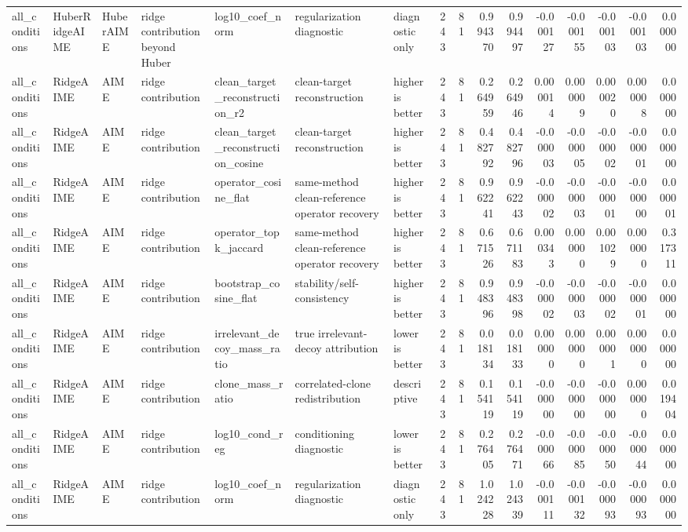 \begin{table}[t]
\begin{tabular}{lllllllrrrrrrrrr}
all_conditions & HuberRidgeAIME & HuberAIME & ridge contribution beyond Huber & log10_coef_norm & regularization diagnostic & diagnostic only & 243 & 81 & 0.994370 & 0.994497 & -0.000127 & -0.000155 & -0.000103 & -0.000103 & 0.000000 \\
all_conditions & RidgeAIME & AIME & ridge contribution & clean_target_reconstruction_r2 & clean-target reconstruction & higher is better & 243 & 81 & 0.264959 & 0.264946 & 0.000014 & 0.000009 & 0.000020 & 0.000008 & 0.000000 \\
all_conditions & RidgeAIME & AIME & ridge contribution & clean_target_reconstruction_cosine & clean-target reconstruction & higher is better & 243 & 81 & 0.482792 & 0.482796 & -0.000003 & -0.000005 & -0.000002 & -0.000001 & 0.000000 \\
all_conditions & RidgeAIME & AIME & ridge contribution & operator_cosine_flat & same-method clean-reference operator recovery & higher is better & 243 & 81 & 0.962241 & 0.962243 & -0.000002 & -0.000003 & -0.000001 & -0.000000 & 0.000001 \\
all_conditions & RidgeAIME & AIME & ridge contribution & operator_topk_jaccard & same-method clean-reference operator recovery & higher is better & 243 & 81 & 0.671526 & 0.671183 & 0.000343 & 0.000000 & 0.001029 & 0.000000 & 0.317311 \\
all_conditions & RidgeAIME & AIME & ridge contribution & bootstrap_cosine_flat & stability/self-consistency & higher is better & 243 & 81 & 0.948396 & 0.948398 & -0.000002 & -0.000003 & -0.000002 & -0.000001 & 0.000000 \\
all_conditions & RidgeAIME & AIME & ridge contribution & irrelevant_decoy_mass_ratio & true irrelevant-decoy attribution & lower is better & 243 & 81 & 0.018134 & 0.018133 & 0.000000 & 0.000000 & 0.000001 & 0.000000 & 0.000000 \\
all_conditions & RidgeAIME & AIME & ridge contribution & clone_mass_ratio & correlated-clone redistribution & descriptive & 243 & 81 & 0.154119 & 0.154119 & -0.000000 & -0.000000 & -0.000000 & 0.000000 & 0.019404 \\
all_conditions & RidgeAIME & AIME & ridge contribution & log10_cond_reg & conditioning diagnostic & lower is better & 243 & 81 & 0.276405 & 0.276471 & -0.000066 & -0.000085 & -0.000050 & -0.000044 & 0.000000 \\
all_conditions & RidgeAIME & AIME & ridge contribution & log10_coef_norm & regularization diagnostic & diagnostic only & 243 & 81 & 1.024228 & 1.024339 & -0.000111 & -0.000132 & -0.000093 & -0.000093 & 0.000000 \\

\end{tabular}
\end{table}
